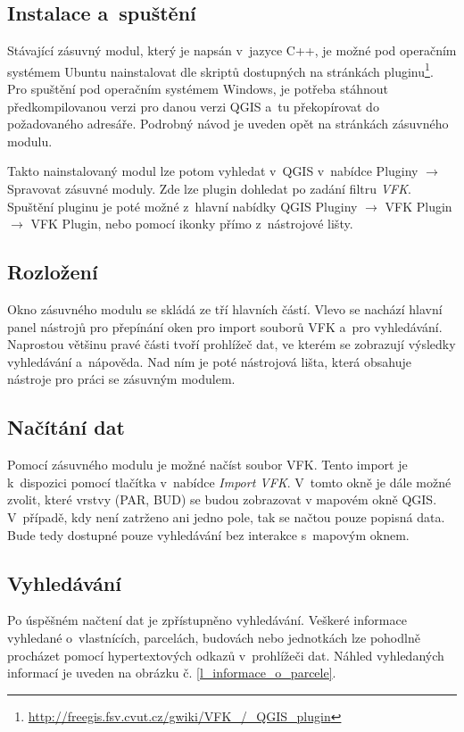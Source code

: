 \documentclass[a4paper,12pt,oneside]{book}
\begin{document}
\subsection{Instalace a~spuštění}
Stávající zásuvný modul, který je napsán v~jazyce C++, je možné pod
operačním systémem Ubuntu nainstalovat dle skriptů dostupných na
stránkách
pluginu\footnote{\url{http://freegis.fsv.cvut.cz/gwiki/VFK\_/\_QGIS\_plugin}}. Pro
spuštění pod operačním systémem Windows, je potřeba stáhnout
předkompilovanou verzi pro danou verzi QGIS a~tu překopírovat do
požadovaného adresáře. Podrobný návod je uveden opět na stránkách
zásuvného modulu.

Takto nainstalovaný modul lze potom vyhledat v~QGIS v~nabídce Pluginy
$\rightarrow$ Spravovat zásuvné moduly. Zde lze plugin dohledat po
zadání filtru \textit{VFK}. Spuštění pluginu je poté možné z~hlavní
nabídky QGIS Pluginy $\rightarrow$ VFK Plugin $\rightarrow$ VFK
Plugin, nebo pomocí ikonky přímo z~nástrojové lišty.

\subsection{Rozložení}
Okno zásuvného modulu se skládá ze tří hlavních částí. Vlevo se
nachází hlavní panel nástrojů pro přepínání oken pro import souborů
VFK a~pro vyhledávání. Naprostou většinu pravé části tvoří prohlížeč
dat, ve kterém se zobrazují výsledky vyhledávání a~nápověda. Nad ním
je poté nástrojová lišta, která obsahuje nástroje pro práci se
zásuvným modulem.

\subsection{Načítání dat}
Pomocí zásuvného modulu je možné načíst soubor VFK. Tento import je
k~dispozici pomocí tlačítka  v~nabídce \textit{Import
  VFK}. V~tomto okně je dále možné zvolit, které vrstvy (PAR, BUD) se budou
zobrazovat v mapovém okně QGIS. V~případě, kdy není zatrženo ani jedno pole,
tak se načtou pouze popisná data. Bude tedy dostupné pouze vyhledávání
bez interakce s~mapovým oknem.

\subsection{Vyhledávání}
Po úspěšném načtení dat je zpřístupněno vyhledávání. Veškeré informace
vyhledané o~vlastnících, parcelách, budovách nebo jednotkách lze
pohodlně procházet pomocí hypertextových odkazů v~prohlížeči
dat. Náhled vyhledaných informací je uveden na obrázku
č. \ref{l_informace_o_parcele}.
\end{document}
